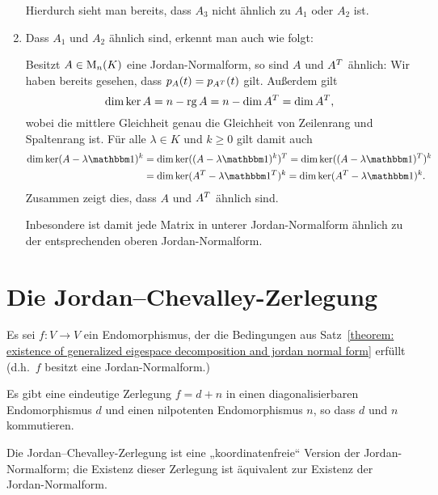 \begin{example}
\begin{enumerate}
      Hierdurch sieht man bereits, dass $A_3$ nicht ähnlich zu $A_1$ oder $A_2$ ist.
      
    \item
      Dass $A_1$ und $A_2$ ähnlich sind, erkennt man auch wie folgt:
      
      Besitzt $A \in \operatorname{M}_{n}(K)$ eine Jordan-Normalform, so sind $A$ und $A^T$ ähnlich:
      Wir haben bereits gesehen, dass $p_{A}(t) = p_{A^T}(t)$ gilt.
      Außerdem gilt
      \[
          \dim \ker A
        = n - \operatorname{rg} A
        = n - \dim A^T
        = \dim A^T,
      \]
      wobei die mittlere Gleichheit genau die Gleichheit von Zeilenrang und Spaltenrang ist.
      Für alle $\lambda \in K$ und $k \geq 0$ gilt damit auch
      \begin{align*}
            \dim \ker (A - \lambda \Id)^k
        &=  \dim \ker \transpose{ ( (A - \lambda \Id)^k ) }
         =  \dim \ker ( \transpose{ (A - \lambda \Id) } )^k
        \\
        &=  \dim \ker ( \transpose{A} - \lambda \transpose{\Id} )^k
         =  \dim \ker (\transpose{A} - \lambda \Id)^k.
      \end{align*}
      Zusammen zeigt dies, dass $A$ und $A^T$ ähnlich sind.
      
      Inbesondere ist damit jede Matrix in unterer Jordan-Normalform ähnlich zu der entsprechenden oberen Jordan-Normalform.
  \end{enumerate}
\end{example}





\section{Die Jordan--Chevalley-Zerlegung}

Es sei $f \colon V \to V$ ein Endomorphismus, der die Bedingungen aus Satz~\ref{theorem: existence of generalized eigespace decomposition and jordan normal form} erfüllt (d.h.\ $f$ besitzt eine Jordan-Normalform.)

\begin{proposition}
  Es gibt eine eindeutige Zerlegung $f = d + n$ in einen diagonalisierbaren Endomorphismus $d$ und einen nilpotenten Endomorphismus $n$, so dass $d$ und $n$ kommutieren.
\end{proposition}

Die Jordan--Chevalley-Zerlegung ist eine „koordinatenfreie“ Version der Jordan-Normalform;
die Existenz dieser Zerlegung ist äquivalent zur Existenz der Jordan-Normalform.

